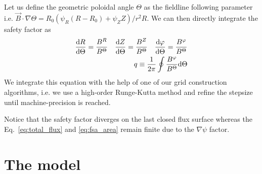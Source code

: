 Let us define the geometric poloidal angle $\Theta$ as the fieldline following
parameter i.e. $\vec B\cdot\nabla\Theta = R_0(\psi_R (R-R_0) + \psi_Z Z)/r^2R$.
We can then directly integrate the safety factor as
\begin{align}\label{eq:safety_factor}
\frac{\mathrm{d} R}{\mathrm{d}\Theta} = \frac{B^R}{B^\Theta}\quad 
\frac{\mathrm{d} Z}{\mathrm{d}\Theta} = \frac{B^Z}{B^\Theta}\quad 
\frac{\mathrm{d} \varphi}{\mathrm{d}\Theta} = \frac{B^\varphi}{B^\Theta}\\
q\equiv\frac{1}{2\pi}\oint \frac{B^\varphi}{B^\Theta} \mathrm{d}\Theta
\end{align}
We integrate this equation with the help of one of our grid
construction algorithms, i.e. we use a high-order Runge-Kutta method
and refine the stepsize until machine-precision is reached.

Notice that the safety factor diverges on the last closed flux
surface whereas the Eq.~\eqref{eq:total_flux} and \eqref{eq:fsa_area}
remain finite due to the $\nabla\psi$ factor.

\section{The model} \label{sec:model}
